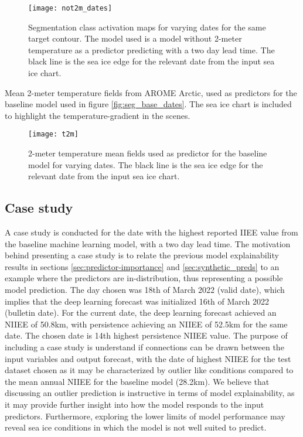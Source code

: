 \documentclass[../main/thesis.tex]{subfiles}
\begin{document}
\begin{figure}
    \centering
    \texttt{[image: not2m\_dates]}
    \caption{\label{fig:seg_not2m_dates}Segmentation class activation maps for varying dates for the same target contour. The model used is a model without 2-meter temperature as a predictor predicting with a two day lead time. The black line is the sea ice edge for the relevant date from the input sea ice chart.}
\end{figure}

Mean 2-meter temperature fields from AROME Arctic, used as predictors for the baseline model used in figure \ref{fig:seg_base_dates}. The sea ice chart is included to highlight the temperature-gradient in the scenes.

\begin{figure}
    \centering
    \texttt{[image: t2m]}
    \caption{\label{fig:t2m_dates}2-meter temperature mean fields used as predictor for the baseline model for varying dates. The black line is the sea ice edge for the relevant date from the input sea ice chart.}
\end{figure}

\subsection{Case study}
A case study is conducted for the date with the highest reported IIEE value from the baseline machine learning model, with a two day lead time. The motivation behind presenting a case study is to relate the previous model explainability results in sections \ref{sec:predictor-importance} and \ref{sec:synthetic_preds} to an example where the predictors are in-distribution, thus representing a possible model prediction. The day chosen was 18th of March 2022 (valid date), which implies that the deep learning forecast was initialized 16th of March 2022 (bulletin date). For the current date, the deep learning forecast achieved an NIIEE of 50.8km, with persistence achieving an NIIEE of 52.5km for the same date. The chosen date is 14th highest persistence NIIEE value. The purpose of including a case study is understand if connections can be drawn between the input variables and output forecast, with the date of highest NIIEE for the test dataset chosen as it may be characterized by outlier like conditions compared to the mean annual NIIEE for the baseline model (28.2km). We believe that discussing an outlier prediction is instructive in terms of model explainability, as it may provide further insight into how the model responds to the input predictors. Furthermore, exploring the lower limits of model performance may reveal sea ice conditions in which the model is not well suited to predict.
\end{document}
